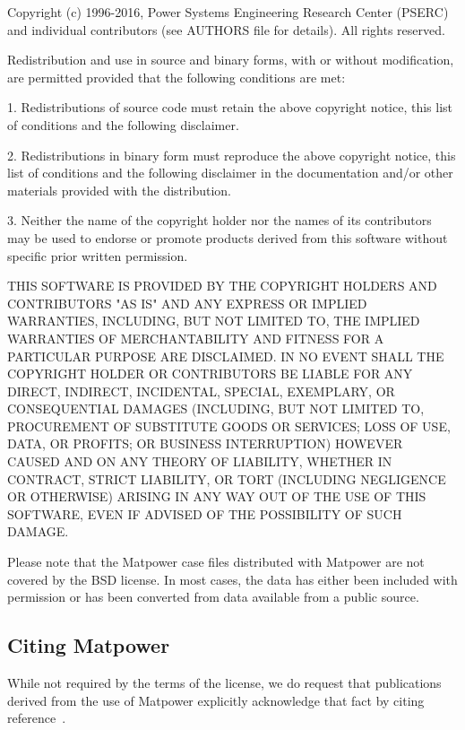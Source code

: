 \documentclass[12pt]{article}
\newcommand{\matpower}[0]{{\sc Matpower}}
\numberwithin{equation}{section}
\numberwithin{table}{section}
\numberwithin{figure}{section}
\begin{document}
\begin{Notice}
Copyright (c) 1996-2016, Power Systems Engineering Research Center
(PSERC) and individual contributors (see AUTHORS file for details).
All rights reserved.

Redistribution and use in source and binary forms, with or without
modification, are permitted provided that the following conditions
are met:

1. Redistributions of source code must retain the above copyright
notice, this list of conditions and the following disclaimer.

2. Redistributions in binary form must reproduce the above copyright
notice, this list of conditions and the following disclaimer in the
documentation and/or other materials provided with the distribution.

3. Neither the name of the copyright holder nor the names of its
contributors may be used to endorse or promote products derived from
this software without specific prior written permission.

THIS SOFTWARE IS PROVIDED BY THE COPYRIGHT HOLDERS AND CONTRIBUTORS
"AS IS" AND ANY EXPRESS OR IMPLIED WARRANTIES, INCLUDING, BUT NOT
LIMITED TO, THE IMPLIED WARRANTIES OF MERCHANTABILITY AND FITNESS
FOR A PARTICULAR PURPOSE ARE DISCLAIMED. IN NO EVENT SHALL THE
COPYRIGHT HOLDER OR CONTRIBUTORS BE LIABLE FOR ANY DIRECT, INDIRECT,
INCIDENTAL, SPECIAL, EXEMPLARY, OR CONSEQUENTIAL DAMAGES (INCLUDING,
BUT NOT LIMITED TO, PROCUREMENT OF SUBSTITUTE GOODS OR SERVICES;
LOSS OF USE, DATA, OR PROFITS; OR BUSINESS INTERRUPTION) HOWEVER
CAUSED AND ON ANY THEORY OF LIABILITY, WHETHER IN CONTRACT, STRICT
LIABILITY, OR TORT (INCLUDING NEGLIGENCE OR OTHERWISE) ARISING IN
ANY WAY OUT OF THE USE OF THIS SOFTWARE, EVEN IF ADVISED OF THE
POSSIBILITY OF SUCH DAMAGE.
\end{Notice}

Please note that the \matpower{} case files distributed with \matpower{} are not covered by the BSD license. In most cases, the data has either been included with permission or has been converted from data available from a public source.

\subsection{Citing \matpower{}}

While not required by the terms of the license, we do request that publications derived from the use of \matpower{} explicitly acknowledge that fact by citing reference~\cite{zimmerman2011}.
\end{document}
